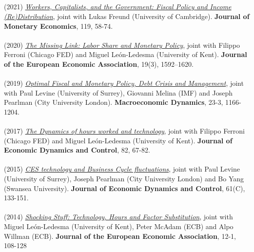 \documentclass[margin, 11pt]{res} %
\begin{document}
\begin{resume}
\section{}
(2021) \emph{\href{https://www.sciencedirect.com/science/article/abs/pii/S0304393221000040}{Workers, Capitalists, and the Government: Fiscal Policy and Income (Re)Distribution}}, joint with Lukas Freund (University of Cambridge).
\textbf{Journal of Monetary Economics}, 119, 58-74.\\
\\
(2020) \emph{\href{https://academic.oup.com/jeea/advance-article/doi/10.1093/jeea/jvaa034/5884931}{The Missing Link: Labor Share and Monetary Policy}}, joint with Filippo Ferroni (Chicago FED) and Miguel Le\'{o}n-Ledesma (University of Kent).
\textbf{Journal of the European Economic Association}, 19(3), 1592–1620.\\
\\
(2019) \emph{\href{https://www.cambridge.org/core/journals/macroeconomic-dynamics/article/optimal-fiscal-and-monetary-policy-debt-crisis-and-management/4E05CEF51FA691092B6EE52ACC807F5E}{Optimal Fiscal and Monetary Policy, Debt Crisis and
Management}}, joint with  Paul Levine (University of Surrey), Giovanni Melina (IMF) and Joseph Pearlman (City University London). \textbf{Macroeconomic Dynamics}, 23-3, 1166-1204.\\
\\
(2017) \emph{\href{http://www.sciencedirect.com/science/article/pii/S016518891730115X}{The Dynamics of hours worked and technology}}, joint with Filippo Ferroni (Chicago FED) and Miguel Le\'{o}n-Ledesma (University of Kent).
\textbf{Journal of Economic Dynamics and Control}, 82, 67-82.\\
\\
(2015) \emph{\href{https://www.sciencedirect.com/science/article/pii/S0165188915001736}{CES technology and Business Cycle fluctuations}}, joint with Paul Levine (University of Surrey), Joseph Pearlman (City University London) and Bo Yang (Swansea University).
\textbf{Journal of Economic Dynamics and Control}, 61(C), 133-151.\\
\\
(2014) \emph{\href{http://onlinelibrary.wiley.com/doi/10.1111/jeea.12038/abstract}{Shocking Stuff: Technology, Hours and Factor Substitution}}, joint with Miguel Le\'{o}n-Ledesma (University of Kent), Peter McAdam (ECB) and Alpo Willman (ECB). 
\textbf{Journal of the European Economic Association}, 12-1, 108-128\\
\\

\end{resume}
\end{document}
